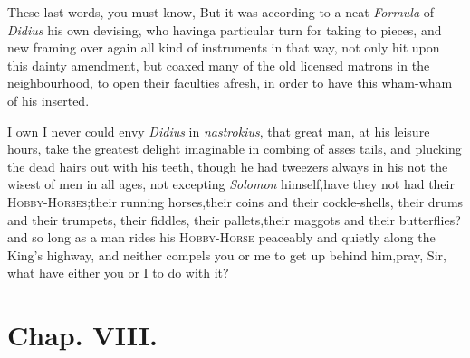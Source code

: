 \documentclass{article}
\begin{document}
These last words, you must know,\break
{} 
 But
it was according to a neat \textit{Formula} of \textit{Didius} his own devising, who
having\pb a particular turn for taking to pieces, and new framing over again all
kind of instruments in that way, not only hit upon this dainty amendment, but coaxed
many of the old licensed matrons in the neighbourhood, to open their faculties
afresh, in order to have this wham-wham of his inserted.

I own I never could envy \textit{Didius} in
\textit{nastrokius}, that great man, at his leisure hours, take the
greatest delight imagin\-able in combing of asses tails, and plucking
the dead hairs out with his teeth, though he had tweezers always in
his
 not the wisest of
men in all ages, not excepting \textit{Solomon} himself,\tsk  have
they not had their
\textsc{Hobby-Horses};\tsk  their running
horses,\tsk  their coins and their cockle-shells, their drums and
their trumpets, their fiddles, their pallets,\tsk  their maggots
and their butterflies?\tsk  and so long as a man rides his
\textsc{Hobby-Horse} peaceably and quietly
along the King’s highway, and neither compels you or me to
get up behind him,\tsk  pray, Sir, what have either you or I to do
with it?

\section{Chap. VIII.}
\end{document}

